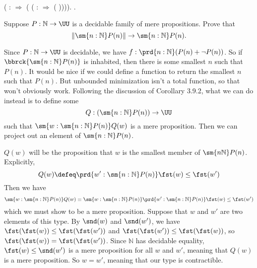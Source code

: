 \begin{coqdoccode}
\coqdocindent{1.00em}
 (  : \coqdocnotation{\ensuremath{\lnot}} \coqdocnotation{(}  \coqdocnotation{\ensuremath{\lnot}} \coqdocnotation{)} \ensuremath{\Rightarrow}  ( ( : \ensuremath{\Rightarrow}  ( )))).\coqdoceol
\coqdocnoindent
{}.\coqdoceol
\coqdocemptyline
\coqdocemptyline
\end{coqdoccode}
Suppose $P : \mathbb{N} \to \UU$ is a decidable family of mere propositions.
Prove that
\[
  \left\lVert \sm{n:\mathbb{N}} P(n) \right\rVert
  \to
  \sm{n:\mathbb{N}} P(n).
\]


 \soln
Since $P : \mathbb{N} \to \UU$ is decidable, we have $f : \prd{n:\mathbb{N}}
(P(n) + \lnot P(n))$.  So if $\bbrck{\sm{n:\mathbb{N}}
P(n)}$ is inhabited, then there is some smallest $n$ such that $P(n)$.
It would be nice if we could define a function to return the
smallest $n$ such that $P(n)$.  But unbounded minimization isn't a
total function, so that won't obviously work.  Following the
discussion of Corollary 3.9.2, what we can do instead is to define some
\[
  Q : \left(\sm{n:\mathbb{N}} P(n)\right) \to \UU
\]
such that $\sm{w:\sm{n:\mathbb{N}} P(n)} Q(w)$ is a mere proposition.  Then
we can project out an element of $\sm{n:\mathbb{N}} P(n)$.


$Q(w)$ will be the proposition that $w$ is the smallest member of
$\sm{n\mathbb{N}}P(n)$.  Explicitly,
\[
  Q(w) \defeq 
  \prd{w' : \sm{n:\mathbb{N}}P(n)} \fst(w) \leq \fst(w')
\]
Then we have
\[
  \sm{w : \sm{n : \mathbb{N}} P(n)} Q(w)
  \equiv
  \sm{w : \sm{n : \mathbb{N}} P(n)}
  \prd{w' : \sm{n:\mathbb{N}}P(n)} \fst(w) \leq \fst(w')
\]
which we must show to be a mere proposition.  Suppose that $w$ and $w'$ are two
elements of this type.  By $\snd(w)$ and $\snd(w')$, we have $\fst(\fst(w)) \leq
\fst(\fst(w'))$ and $\fst(\fst(w')) \leq \fst(\fst(w))$, so $\fst(\fst(w)) = \fst(\fst(w'))$.  Since
$\mathbb{N}$ has decidable equality, $\fst(w) \leq \snd(w')$ is a mere
proposition for all $w$ and $w'$, meaning that $Q(w)$ is a mere proposition.
So $w = w'$, meaning that our type is contractible.


